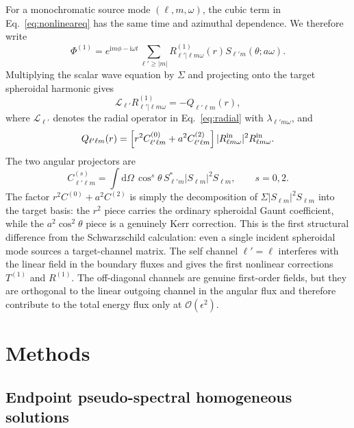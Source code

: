 \documentclass[aps,prd,twocolumn,nofootinbib,superscriptaddress,10pt,floatfix]{revtex4-2}
\newcommand{\ii}{\mathrm{i}}
\newcommand{\dd}{\mathrm{d}}
\newcommand{\calO}{\mathcal{O}}
\begin{document}
For a monochromatic source mode $(\ell,m,\omega)$, the cubic term in
Eq.~\eqref{eq:nonlineareq} has the same time and azimuthal dependence.  We
therefore write
\begin{equation}
\Phi^{(1)}
=
e^{\ii m\phi-\ii\omega t}
\sum_{\ell'\ge |m|}
R_{\ell'|\ell m\omega}^{(1)}(r)S_{\ell'm}(\theta;a\omega).
\end{equation}
Multiplying the scalar wave equation by $\Sigma$ and projecting onto the target
spheroidal harmonic gives
\begin{equation}
\mathcal{L}_{\ell'}R_{\ell'|\ell m\omega}^{(1)}
=-Q_{\ell'\ell m}(r),
\label{eq:sourceeq}
\end{equation}
where $\mathcal{L}_{\ell'}$ denotes the radial operator in
Eq.~\eqref{eq:radial} with $\lambda_{\ell'm\omega}$, and
\begin{equation}
Q_{\ell'\ell m}(r)=
\left[
r^2 C^{(0)}_{\ell'\ell m}
+a^2 C^{(2)}_{\ell'\ell m}
\right]
|R_{\ell m\omega}^{\rm in}|^2R_{\ell m\omega}^{\rm in}.
\label{eq:Q}
\end{equation}
The two angular projectors are
\begin{equation}
C^{(s)}_{\ell'\ell m}
=
\int \dd\Omega\,
\cos^s\theta\,
S^*_{\ell'm}|S_{\ell m}|^2S_{\ell m},
\qquad s=0,2 .
\label{eq:C}
\end{equation}
The factor $r^2C^{(0)}+a^2C^{(2)}$ is simply the decomposition of
$\Sigma|S_{\ell m}|^2S_{\ell m}$ into the target basis:
the $r^2$ piece carries the ordinary spheroidal Gaunt coefficient, while the
$a^2\cos^2\theta$ piece is a genuinely Kerr correction.
This is the first structural difference from the Schwarzschild calculation:
even a single incident spheroidal mode sources a target-channel matrix.  The
self channel $\ell'=\ell$ interferes with the linear field in the boundary
fluxes and gives the first nonlinear corrections $T^{(1)}$ and $R^{(1)}$.
The off-diagonal channels are genuine first-order fields, but they are
orthogonal to the linear outgoing channel in the angular flux and therefore
contribute to the total energy flux only at $\calO(\epsilon^2)$.

\section{Methods}
\label{sec:methods}

\subsection{Endpoint pseudo-spectral homogeneous solutions}
\end{document}
